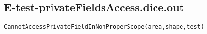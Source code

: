 \subsection{E-test-privateFieldsAccess.dice.out}
\begin{verbatim}
CannotAccessPrivateFieldInNonProperScope(area,shape,test)

\end{verbatim}